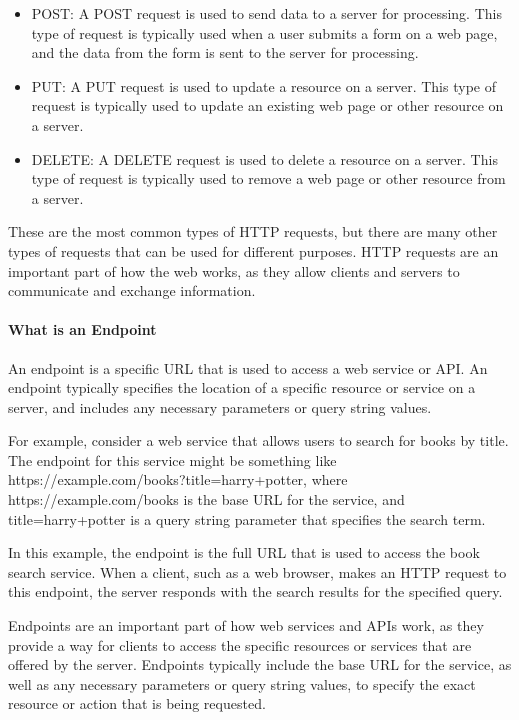 {\begin{itemize}
\item POST: A POST request is used to send data to a server for processing. This type of request is typically used when a user submits a form on a web page, and the data from the form is sent to the server for processing.

\item PUT: A PUT request is used to update a resource on a server. This type of request is typically used to update an existing web page or other resource on a server.

\item DELETE: A DELETE request is used to delete a resource on a server. This type of request is typically used to remove a web page or other resource from a server.
\end{itemize}

These are the most common types of HTTP requests, but there are many other types of requests that can be used for different purposes. HTTP requests are an important part of how the web works, as they allow clients and servers to communicate and exchange information.

\paragraph{What is an Endpoint}

An endpoint is a specific URL that is used to access a web service or API. An endpoint typically specifies the location of a specific resource or service on a server, and includes any necessary parameters or query string values.

For example, consider a web service that allows users to search for books by title. The endpoint for this service might be something like https://example.com/books?title=harry+potter, where https://example.com/books is the base URL for the service, and title=harry+potter is a query string parameter that specifies the search term.

In this example, the endpoint is the full URL that is used to access the book search service. When a client, such as a web browser, makes an HTTP request to this endpoint, the server responds with the search results for the specified query.

Endpoints are an important part of how web services and APIs work, as they provide a way for clients to access the specific resources or services that are offered by the server. Endpoints typically include the base URL for the service, as well as any necessary parameters or query string values, to specify the exact resource or action that is being requested.

}
